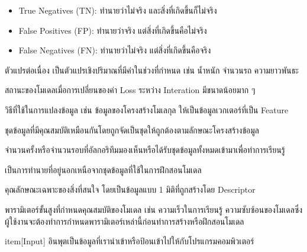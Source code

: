 \begin{description}[style=nextline]
\begin{itemize}[topsep=0pt,noitemsep]
        \item True Negatives (TN): ทำนายว่าไม่จริง และสิ่งที่เกิดขึ้นก็ไม่จริง
        
        \item False Positives (FP): ทำนายว่าจริง แต่สิ่งที่เกิดขึ้นคือไม่จริง
        
        \item False Negatives (FN): ทำนายว่าไม่จริง แต่สิ่งที่เกิดขึ้นคือจริง
    \end{itemize}

    \item[Continuous Variables] ตัวแปรต่อเนื่อง เป็นตัวแปรเชิงปริมาณที่มีค่าในช่วงที่กำหนด เช่น น้ำหนัก จำนวนรถ ความยาวพันธะ

    \item[Convergence] สถานะของโมเดลเมื่อการเปลี่ยนของค่า Loss ระหว่าง Interation มีขนาดน้อยมาก ๆ

    \item[Descriptor] วิธีที่ใช้ในการแปลงข้อมูล เช่น ข้อมูลของโครงสร้างโมเลกุล ให้เป็นข้อมูลเวกเตอร์ที่เป็น Feature

    \item[Dataset หรือ Data Set] ชุดข้อมูลที่มีคุณสมบัติเหมือนกันโดยถูกจัดเป็นชุดให้ถูกต้องตามลักษณะโครงสร้างข้อมูล

    \item[Epoch] จำนวนครั้งหรือจำนวนรอบที่อัลกอริทึมมองเห็นหรือได้รับชุดข้อมูลทั้งหมดเข้ามาเพื่อทำการเรียนรู้

    \item[Extrapolation] เป็นการทำนายที่อยู่นอกเหนือจากชุดข้อมูลที่ใช้ในการฝึกสอนโมเดล

    \item[Feature] คุณลักษณะเฉพาะของสิ่งที่สนใจ โดยเป็นข้อมูลแบบ 1 มิติที่ถูกสร้างโดย Descriptor

    \item[Hyperparameter] พารามิเตอร์ขั้นสูงที่กำหนดคุณสมบัติของโมเดล เช่น ความเร็วในการเรียนรู้ ความซับซ้อนของโมเดลซึ่งผู้ใช้งานจะต้องทำการกำหนดพารามิเตอร์เหล่านี้ก่อนทำการสร้างหรือฝึกสอนโมเดล

    item[Input] อินพุตเป็นข้อมูลที่เรานำเข้าหรือป้อนเข้าไปให้กับโปรแกรมคอมพิวเตอร์


\end{description}
